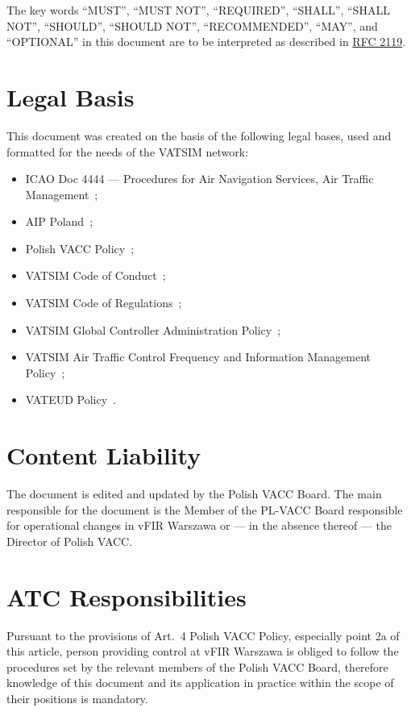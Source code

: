 The key words ``MUST'', ``MUST NOT'', ``REQUIRED'', ``SHALL'', ``SHALL
      NOT'', ``SHOULD'', ``SHOULD NOT'', ``RECOMMENDED'',  ``MAY'', and
      ``OPTIONAL'' in this document are to be interpreted as described in
      \href{https://www.rfc-editor.org/rfc/rfc2119}{RFC 2119}.

\section{Legal Basis}
This document was created on the basis of the following legal bases, used and formatted for the needs of the VATSIM network:
\begin{itemize}
    \item ICAO Doc 4444 --- Procedures for Air Navigation Services, Air Traffic Management~\cite{4444};
    \item AIP Poland~\cite{aip};
    \item Polish VACC Policy~\cite{policy};
    \item VATSIM Code of Conduct~\cite{coc};
    \item VATSIM Code of Regulations~\cite{cor};
    \item VATSIM Global Controller Administration Policy~\cite{gcap};
    \item VATSIM Air Traffic Control Frequency and Information Management Policy~\cite{atis};
    \item VATEUD Policy~\cite{vateud}.
\end{itemize}

\section{Content Liability}
The document is edited and updated by the Polish VACC Board. The main responsible for the document is the Member of the PL-VACC Board responsible for operational changes in vFIR Warszawa or --- in the absence thereof --- the Director of Polish VACC\@.

\section{ATC Responsibilities}
Pursuant to the provisions of Art.\ 4 Polish VACC Policy, especially point 2a of
this article, person providing control at vFIR Warszawa is obliged to follow the
procedures set by the relevant members of the Polish VACC Board, therefore
knowledge of this document and its application in practice within the scope of
their positions is mandatory.

